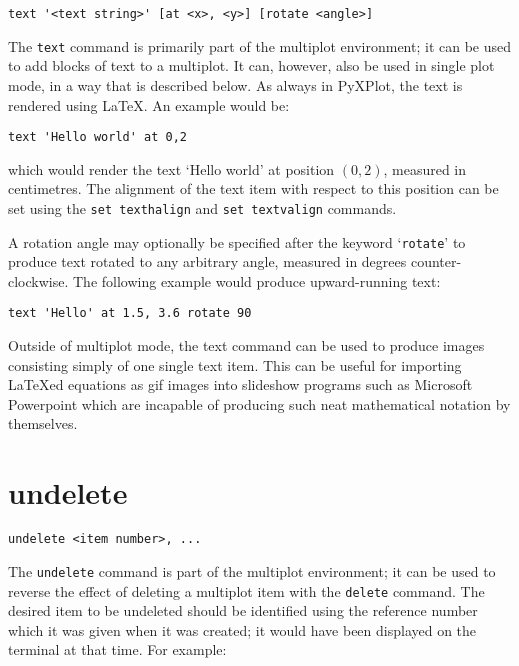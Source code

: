 \begin{verbatim}
text '<text string>' [at <x>, <y>] [rotate <angle>]
\end{verbatim}

The {\tt text} command is primarily part of the multiplot environment; it can be
used to add blocks of text to a multiplot. It can, however, also be used in
single plot mode, in a way that is described below. As always in PyXPlot, the
text is rendered using \LaTeX. An example would be:

\begin{verbatim}
text 'Hello world' at 0,2
\end{verbatim}

\noindent which would render the text `Hello world' at position $(0,2)$,
measured in centimetres. The alignment of the text item with respect to this
position can be set using the {\tt set texthalign} and {\tt set textvalign}
commands.

A rotation angle may optionally be specified after the keyword `{\tt rotate}'
to produce text rotated to any arbitrary angle, measured in degrees
counter-clockwise. The following example would produce upward-running text:

\begin{verbatim}
text 'Hello' at 1.5, 3.6 rotate 90
\end{verbatim}

Outside of multiplot mode, the text command can be used to produce images
consisting simply of one single text item. This can be useful for importing
\LaTeX ed equations as gif images into slideshow programs such as Microsoft
Powerpoint which are incapable of producing such neat mathematical notation
by themselves.

\section{undelete}

\begin{verbatim}
undelete <item number>, ...
\end{verbatim}

The {\tt undelete} command is part of the multiplot environment; it can be used
to reverse the effect of deleting a multiplot item with the {\tt delete}
command. The desired item to be undeleted should be identified using the
reference number which it was given when it was created; it would have been
displayed on the terminal at that time. For example:

